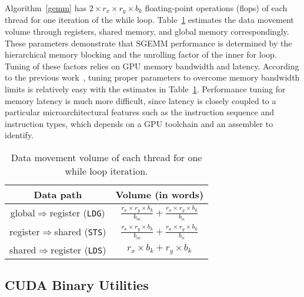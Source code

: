 Algorithm~\ref{gemm} has $2\times r_x \times r_y \times b_k$ floating-point operations (flops) of each thread for one iteration of the while loop.
Table~\ref{tab:dm} estimates the data movement volume through registers, shared memory, and global 
memory correspondingly.
These parameters demonstrate that SGEMM performance is determined by the hierarchical memory blocking and the unrolling factor of the inner for loop.
Tuning of these factors relies on GPU memory bandwidth and latency. 
According to the previous work~\cite{magma,tan}, tuning proper parameters to overcome memory bandwidth limits is relatively easy with the estimates in Table~\ref{tab:dm}.
Performance tuning for memory latency is much more difficult, since latency is closely coupled to a particular microarchitectural features such as the instruction sequence and instruction types, which depends on a GPU toolchain and an assembler to identify. 
\begin{table}[htbp]
    \caption{ Data movement volume of each thread for one while loop iteration.} %
\centering
\scalebox{0.8} {
\begin{tabular}{|c|c|}
\hline
    Data path& Volume (in words)\\
\hline
    global$\Rightarrow$register ({\tt LDG})& $\frac{r_x \times r_y \times b_k}{b_m} + \frac{r_x\times r_y \times b_k}{b_n}$ \\
\hline
register$\Rightarrow$shared ({\tt STS})& $\frac{r_x \times r_y \times b_k}{b_m} + \frac{r_x\times r_y \times b_k}{b_n}$ \\
\hline
shared$\Rightarrow$register ({\tt LDS})& $r_x\times b_k + r_y\times b_k$\\
\hline
\end{tabular}
}
\label{tab:dm}
\end{table}



\subsection{CUDA Binary Utilities}
\label{sec:cuda}

